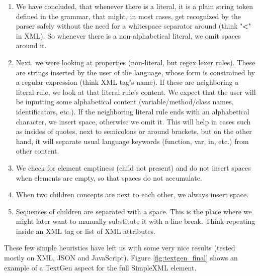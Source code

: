 \begin{enumerate}
	\item We have concluded, that whenever there is a literal, it is a plain string token defined in the grammar, that might, in most cases, get recognized by the parser safely without the need for a whitespace separator around (think \textbf{'\textless'} in XML).
	So whenever there is a non-alphabetical literal, we omit spaces around it.

	\item Next, we were looking at properties (non-literal, but regex lexer rules).
	These are strings inserted by the user of the language, whose form is constrained by a regular expression (think XML tag's name).
	If these are neighboring a literal rule, we look at that literal rule's content.
	We expect that the user will be inputting some alphabetical content (variable/method/class names, identificators, etc.).
	If the neighboring literal rule ends with an alphabetical character, we insert space, otherwise we omit it.
	This will help in cases such as insides of quotes, next to semicolons or around brackets, but on the other hand, it will separate usual language keywords (function, var, in, etc.) from other content.

	\item We check for element emptiness (child not present) and do not insert spaces when elements are empty, so that spaces do not accumulate.

	\item When two children concepts are next to each other, we always insert space.

	\item Sequences of children are separated with a space. This is the place where we might later want to manually substitute it with a line break. Think repeating  inside an XML tag or list of XML attributes.
\end{enumerate}

These few simple heuristics have left us with some very nice results (tested mostly on XML, JSON and JavaScript). Figure \ref{fig:textgen_final} shows an example of a TextGen aspect for the full SimpleXML element.
\\

